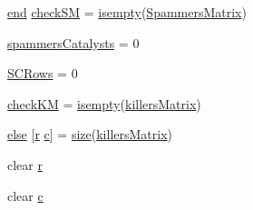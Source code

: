 \begin{DoxyCompactItemize}
\item 
\hyperlink{a00025_afb358f48b1646c750fb9da6c6585be2b}{end} \hyperlink{a00029_ae80cf4c5bf659247b45bbad5d22dec52}{check\-S\-M} = \hyperlink{a00025_ac10445404f4b83302522defb59e25ef7}{isempty}(\hyperlink{a00030_a5bca8ffaecd726e70d088f2e00c9b4e0}{Spammers\-Matrix})
\item 
\hyperlink{a00029_aac2cfcb79655911b15197407f3e8c51c}{spammers\-Catalysts} = 0
\item 
\hyperlink{a00029_a4c9731061d3ea74c9ad35793b15491ab}{S\-C\-Rows} = 0
\item 
\hyperlink{a00029_ac9c871eaf7455dc0d274ec20c5c69ac2}{check\-K\-M} = \hyperlink{a00025_ac10445404f4b83302522defb59e25ef7}{isempty}(\hyperlink{a00030_ab372fd9c8bb38cf3c78e995c0698b0ca}{killers\-Matrix})
\item 
\hyperlink{a00029_af5946383720aa572eb93e1e63afc23c2}{else} \mbox{[}\hyperlink{a00031_ac862e7284527eb913b1351c8bfb8e079}{r} \hyperlink{a00035_a6be92348ba85ef257b11d06209e1d7b6}{c}\mbox{]} = \hyperlink{a00062_ae113ea7f9e515a12ac4b5595c6faf61e}{size}(\hyperlink{a00030_ab372fd9c8bb38cf3c78e995c0698b0ca}{killers\-Matrix})
\item 
clear \hyperlink{a00029_ac862e7284527eb913b1351c8bfb8e079}{r}
\item 
clear \hyperlink{a00029_a8e54ca14679a1ce9245a3b7d55d95570}{c}
\end{DoxyCompactItemize}


